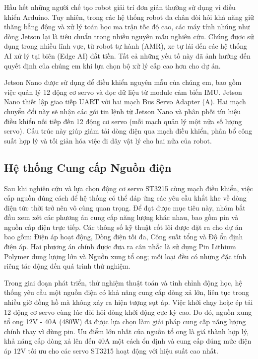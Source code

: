 Hầu hết những người chế tạo robot giải trí đơn giản thường sử dụng vi điều khiển Arduino. Tuy nhiên, trong các hệ thống robot đa chân đòi hỏi khả năng giữ thăng bằng động và xử lý toán học ma trận tốc độ cao, các máy tính nhúng như dòng Jetson lại là tiêu chuẩn trong nhiều nguyên mẫu nghiên cứu. Chúng được sử dụng trong nhiều lĩnh vực, từ robot tự hành (AMR), xe tự lái đến các hệ thống AI xử lý tại biên (Edge AI) đắt tiền. Tất cả những yếu tố này đã ảnh hưởng đến quyết định của chúng em khi lựa chọn bộ xử lý cấp cao hơn cho dự án.

Jetson Nano được sử dụng để điều khiển nguyên mẫu của chúng em, bao gồm việc quản lý 12 động cơ servo và đọc dữ liệu từ module cảm biến IMU. Jetson Nano thiết lập giao tiếp UART với hai mạch Bus Servo Adapter (A). Hai mạch chuyển đổi này sẽ nhận các gói tin lệnh từ Jetson Nano và phân phối tín hiệu điều khiển nối tiếp đến 12 động cơ servo (mỗi mạch quản lý một nửa số lượng servo). Cấu trúc này giúp giảm tải dòng điện qua mạch điều khiển, phân bổ công suất hợp lý và tối giản hóa việc đi dây vật lý cho hai nửa của robot. 

\subsection{ Hệ thống Cung cấp Nguồn điện}

Sau khi nghiên cứu và lựa chọn động cơ servo ST3215 cùng mạch điều khiển, việc cấp nguồn đúng cách để hệ thống có thể đáp ứng các yêu cầu khắt khe về dòng điện tức thời trở nên vô cùng quan trọng. Để đạt được mục tiêu này, nhóm bắt đầu xem xét các phương án cung cấp năng lượng khác nhau, bao gồm pin và nguồn cấp điện trực tiếp. Các thông số kỹ thuật cốt lõi được đặt ra cho dự án bao gồm: Điện áp hoạt động, Dòng điện tối đa, Công suất tổng và Độ ổn định điện áp. Hai phương án chính được đưa ra cân nhắc là sử dụng Pin Lithium Polymer dung lượng lớn và Nguồn xung tổ ong; mỗi loại đều có những đặc tính riêng tác động đến quá trình thử nghiệm.

Trong giai đoạn phát triển, thử nghiệm thuật toán và tinh chỉnh động học, hệ thống yêu cầu một nguồn điện có khả năng cung cấp dòng xả lớn, liên tục trong nhiều giờ đồng hồ mà không xảy ra hiện tượng sụt áp. Việc khởi chạy hoặc ép tải 12 động cơ servo cùng lúc đòi hỏi dòng khởi động cực kỳ cao. Do đó, nguồn xung tổ ong 12V - 40A (480W) đã được lựa chọn làm giải pháp cung cấp năng lượng chính thay vì dùng pin. Ưu điểm lớn nhất của nguồn tổ ong là giá thành hợp lý, khả năng cấp dòng xả lên đến 40A một cách ổn định và cung cấp đúng mức điện áp 12V tối ưu cho các servo ST3215 hoạt động với hiệu suất cao nhất. 


